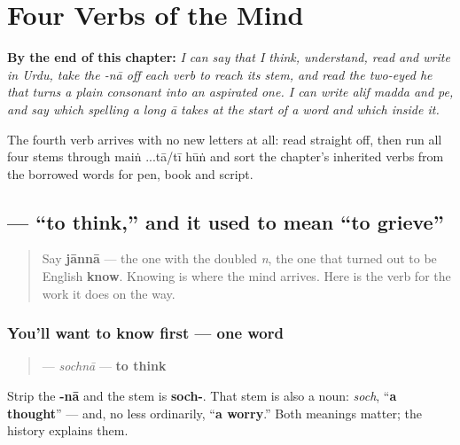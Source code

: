 
\chapter{Four Verbs of the Mind}
\label{ch:ur-mind-verbs}

\begin{chapteropening}
\textbf{By the end of this chapter:} \emph{I can say that I think, understand, read and write in Urdu, take the -nā off each verb to reach its stem, and read the two-eyed he that turns a plain consonant into an aspirated one. I can write alif madda and pe, and say which spelling a long ā takes at the start of a word and which inside it.}

The fourth verb arrives with no new letters at all: read  straight off, then run all four stems through maiṅ ...tā/tī hūṅ and sort the chapter's inherited verbs from the borrowed words for pen, book and script.
\end{chapteropening}

\section[\texorpdfstring{\ur{سوچنا} (sochnā)}{سوچنا (sochnā)}]{ — “to think,” and it used to mean “to grieve”}

\label{lesson:UR-C07-sochna}



\begin{quote}
Say \textbf{jānnā} — the one with the doubled \emph{n}, the one that turned out to be English \textbf{know}. Knowing is where the mind arrives. Here is the verb for the work it does on the way.
\end{quote}

\subsection*{You'll want to know first — one word}
\begin{quote}
\textbf{} — \emph{sochnā} — \textbf{to think}
\end{quote}

Strip the \textbf{-nā} and the stem is \textbf{soch-}. That stem is also a noun: \textbf{} \emph{soch}, “\textbf{a thought}” — and, no less ordinarily, “\textbf{a worry}.” Both meanings matter; the history explains them.

